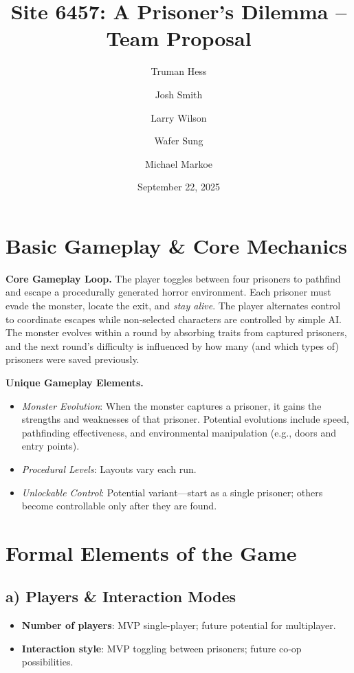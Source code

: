 \documentclass[11pt]{article}
\title{Site 6457: A Prisoner's Dilemma -- Team Proposal}
\author{Truman Hess \and Josh Smith \and Larry Wilson \and Wafer Sung \and Michael Markoe}
\date{September 22, 2025}
\begin{document}
\maketitle
\vspace{-0.8em}

\section{Basic Gameplay \& Core Mechanics}
\textbf{Core Gameplay Loop.} The player toggles between four prisoners to pathfind and escape a procedurally generated horror environment. Each prisoner must evade the monster, locate the exit, and \textit{stay alive}. The player alternates control to coordinate escapes while non-selected characters are controlled by simple AI. The monster evolves within a round by absorbing traits from captured prisoners, and the next round's difficulty is influenced by how many (and which types of) prisoners were saved previously.

\medskip
\textbf{Unique Gameplay Elements.}
\begin{itemize}
  \item \textit{Monster Evolution}: When the monster captures a prisoner, it gains the strengths and weaknesses of that prisoner. Potential evolutions include speed, pathfinding effectiveness, and environmental manipulation (e.g., doors and entry points).
  \item \textit{Procedural Levels}: Layouts vary each run.
  \item \textit{Unlockable Control}: Potential variant---start as a single prisoner; others become controllable only after they are found.
\end{itemize}

\section{Formal Elements of the Game}

\subsection*{a) Players \& Interaction Modes}
\begin{itemize}
  \item \textbf{Number of players}: MVP single-player; future potential for multiplayer.
  \item \textbf{Interaction style}: MVP toggling between prisoners; future co-op possibilities.
\end{itemize}
\end{document}
